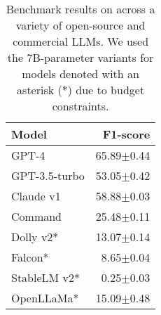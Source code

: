 \documentclass[../report.tex]{subfiles}
\begin{document}
\begin{table}[t]
\centering
\begin{tabular}{@{}lr@{}}
\toprule
Model & F1-score \\ \midrule
GPT-4 \citep{OpenAI2023GPT4}                & 65.89$\pm$0.44 \\
GPT-3.5-turbo                               & 53.05$\pm$0.42 \\
Claude v1 \citep{Anthropic2023Claude}       & 58.88$\pm$0.03 \\
Command \citep{Command2023Cohere}           & 25.48$\pm$0.11 \\
Dolly v2* \citep{DatabricksBlog2023DollyV2} & 13.07$\pm$0.14 \\
Falcon* \citep{Falcon40b}                   & 8.65$\pm$0.04  \\
StableLM v2* \citep{StableLM2023}           & 0.25$\pm$0.03  \\
OpenLLaMa* \citep{openlm2023openllama}      & 15.09$\pm$0.48 \\
\bottomrule
\end{tabular}
\caption{
    Benchmark results on \tlunified{} across a variety of open-source and commercial LLMs.
    We used the 7B-parameter variants for models denoted with an asterisk ($\ast$) due to budget constraints.
}
\label{table:results_llm}
\end{table}
\end{document}
